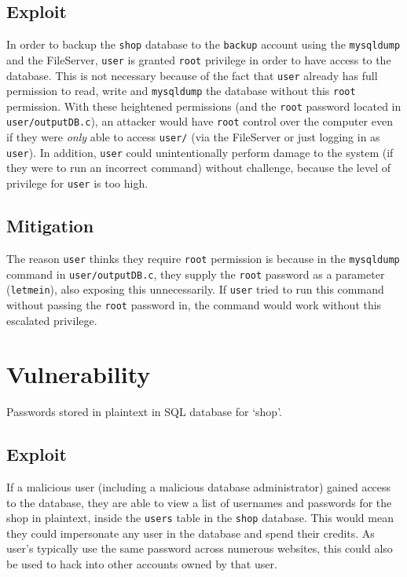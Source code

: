 \documentclass[11pt]{article}
\begin{document}
\subsection{Exploit}

In order to backup the \texttt{shop} database to the \texttt{backup} account using the \texttt{mysqldump} and the FileServer, \texttt{user} is granted \texttt{root} privilege in order to have access to the database. This is not necessary because of the fact that \texttt{user} already has full permission to read, write and \texttt{mysqldump} the database  without this \texttt{root} permission. With these heightened permissions (and the \texttt{root} password located in \texttt{user/outputDB.c}), an attacker would have \texttt{root} control over the computer even if they were \textit{only} able to access \texttt{user/} (via the FileServer or just logging in as \texttt{user}). In addition, \texttt{user} could unintentionally perform damage to the system (if they were to run an incorrect command) without challenge, because the level of privilege for \texttt{user} is too high.

\subsection{Mitigation}

The reason \texttt{user} thinks they require \texttt{root} permission is because in the \texttt{mysqldump} command in \texttt{user/outputDB.c}, they supply the \texttt{root} password as a parameter (\texttt{letmein}), also exposing this unnecessarily. If \texttt{user} tried to run this command without passing the \texttt{root} password in, the command would work without this escalated privilege.

\section{Vulnerability}

Passwords stored in plaintext in SQL database for `shop'.

\subsection{Exploit}

If a malicious user (including a malicious database administrator) gained access to the database, they are able to view a list of usernames and passwords for the shop in plaintext, inside the \texttt{users} table in the \texttt{shop} database. This would mean they could impersonate any user in the database and spend their credits. As user's typically use the same password across numerous websites, this could also be used to hack into other accounts owned by that user.
\end{document}
